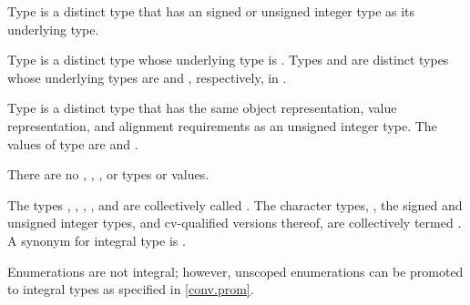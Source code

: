 \pnum
{}%
%
%
Type  is a distinct type that has
an 
signed or unsigned integer type as its underlying type.

\pnum
{}%
%
%
Type  is a distinct type
whose underlying type is .
%
%
%
%
%
%
Types  and  are distinct types
whose underlying types are  and ,
respectively, in .

\pnum
{}%
%
Type  is a distinct type that has
the same object representation,
value representation, and
alignment requirements as
an  unsigned integer type.
The values of type  are
 and .
\begin{note}
There are no , ,
, or  types or values.
\end{note}

\pnum
{}%
The types , ,
, , and 
are collectively called .
The character types, ,
the signed and unsigned integer types,
and cv-qualified versions thereof,
are collectively termed
.
A synonym for integral type is .
\begin{note}
Enumerations are not integral;
however, unscoped enumerations can be promoted to integral types
as specified in \ref{conv.prom}.
\end{note}

